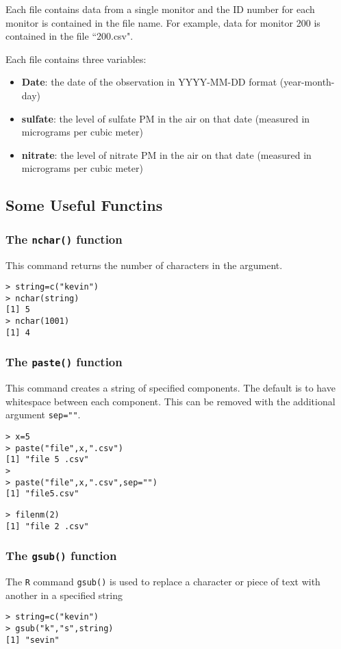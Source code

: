 \documentclass[12pt]{article}
\begin{document}
\bigskip
\noindent Each file contains data from a single monitor and the ID number for each monitor is contained in the file name. For example, data for monitor 200 is contained in the file ``200.csv". 

\bigskip
\noindent Each file contains three variables:
\begin{itemize}
\item \textbf{Date}: the date of the observation in YYYY-MM-DD format (year-month-day)
\item \textbf{sulfate}: the level of sulfate PM in the air on that date (measured in micrograms per cubic meter)
\item \textbf{nitrate}: the level of nitrate PM in the air on that date (measured in micrograms per cubic meter)
\end{itemize}
\newpage
\subsection{Some Useful Functins}
\subsubsection{The \texttt{nchar()} function}
This command returns the number of characters in the argument.
\begin{verbatim}
> string=c("kevin")
> nchar(string)
[1] 5
> nchar(1001)
[1] 4
\end{verbatim}
\subsubsection{The \texttt{paste()} function}
This command creates a string of specified components. The default is to have whitespace between each component. This can be removed with the additional argument \texttt{sep=""}.
\begin{framed}
\begin{verbatim}
> x=5
> paste("file",x,".csv")
[1] "file 5 .csv"
>
> paste("file",x,".csv",sep="")
[1] "file5.csv"
\end{verbatim}
\end{framed}
\begin{verbatim}
> filenm(2)
[1] "file 2 .csv"
\end{verbatim}
\subsubsection{The \texttt{gsub()} function}
The \texttt{R} command \texttt{gsub()} is used to replace a character or piece of text with another in a specified string
\begin{verbatim}
> string=c("kevin")
> gsub("k","s",string)
[1] "sevin"
\end{verbatim}
\newpage
\end{document}
